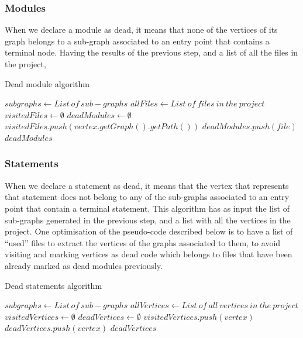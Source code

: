 \documentclass{uvamscse}
\begin{document}
\subsubsection{Modules}
When we declare a module as dead, it means that none of the vertices of its graph belongs to a sub-graph associated to an entry point that contains a terminal node. Having the results of the previous step, and a list of all the files in the project, 
\begin{algorithm}[H]
\caption{Dead module algorithm}
\begin{algorithmic}[1]
\STATE {}
\STATE $subgraphs \gets List\ of\ sub-graphs$
\STATE $allFiles \gets List\ of\ files\ in\ the\ project$
\STATE
\STATE {}
\STATE $visitedFiles \gets \emptyset$
\STATE $deadModules \gets \emptyset$
                \STATE $visitedFiles.push(vertex.getGraph().getPath())$
            \ENDIF
        \ENDFOR
    \ENDIF
\ENDFOR
{}
        \STATE $deadModules.push(file)$
    \ENDIF
\ENDFOR
\RETURN $deadModules$
\end{algorithmic}
\end{algorithm}

\subsubsection{Statements}
When we declare a statement as dead, it means that the vertex that represents that statement does not belong to any of the sub-graphs associated to an entry point that contain a terminal statement. This algorithm has as input the list of sub-graphs generated in the previous step, and a list with all the vertices in the project. One optimisation of the pseudo-code described below is to have a list of ``used'' files to extract the vertices of the graphs associated to them, to avoid visiting and marking vertices as dead code which belongs to files that have been already marked as dead modules previously.

\begin{algorithm}[H]
\caption{Dead statements algorithm}
\begin{algorithmic}[1]
\STATE {}
\STATE $subgraphs \gets List\ of\ sub-graphs$
\STATE $allVertices \gets List\ of\ all\ vertices\ in\ the\ project$
\STATE
\STATE {}
\STATE $visitedVertices \gets \emptyset$
\STATE $deadVertices \gets \emptyset$
                \STATE $visitedVertices.push(vertex)$
        \ENDFOR
    \ENDIF
\ENDFOR
{}
        \STATE $deadVertices.push(vertex)$
    \ENDIF
\ENDFOR
\RETURN $deadVertices$
\end{algorithmic}
\end{algorithm}
\end{document}
